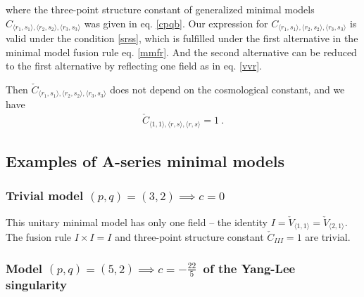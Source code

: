 \documentclass[12pt, a4paper, notitlepage, twoside]{report}
\numberwithin{equation}{section}
\theoremstyle{break}
\begin{document}
where the three-point structure constant of generalized minimal models $C_{\langle r_1,s_1\rangle ,\langle r_2,s_2\rangle ,\langle r_3,s_3 \rangle}$ was given in eq. \eqref{cpqb}. Our expression for $C_{\langle r_1,s_1\rangle ,\langle r_2,s_2\rangle ,\langle r_3,s_3 \rangle}$ is valid under the condition \eqref{srss}, which is fulfilled under the first alternative in the minimal model fusion rule eq. \eqref{mmfr}. And the second alternative can be reduced to the first alternative by reflecting one field as in eq. \eqref{vvr}.

Then $\check{C}_{\langle r_1,s_1\rangle ,\langle r_2,s_2\rangle ,\langle r_3,s_3 \rangle}$ does not depend on the cosmological constant, and we have 
\begin{align}
\boxed{ \check{C}_{\langle 1,1\rangle , \langle r,s \rangle,\langle r,s \rangle}=1}\ .
\end{align}


\subsection{Examples of A-series minimal models}

\subsubsection{Trivial model $(p,q)=(3,2) \implies c = 0$}

This unitary minimal model has only one field -- the identity $I=\check{V}_{\langle 1,1 \rangle}=\check{V}_{\langle 2,1 \rangle}$.
The fusion rule $I\times I = I$ and three-point structure constant $\check{C}_{III} = 1$ are trivial.

\subsubsection{Model $(p,q)=(5,2) \implies c=-\tfrac{22}{5}$\ of the Yang-Lee singularity}
\end{document}
